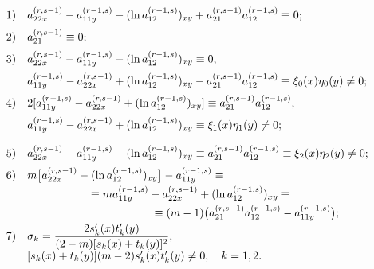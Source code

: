 \begin{equation}
\label{soz:eq34}
\begin{array}{ll}
1) & a_{22x}^{(r,s-1)}-a_{11y}^{(r-1,s)}-(\ln a_{12}^{(r-1,s)})_{xy}+a_{21}^{(r,s-1)}a_{12}^{(r-1,s)}\equiv0; 
\\[2mm]
2) &  a_{21}^{(r,s-1)}\equiv0; 
\\[2mm]
3) & a_{22x}^{(r,s-1)}-a_{11y}^{(r-1,s)}-(\ln a_{12}^{(r-1,s)})_{xy}\equiv0,
\\[2mm]
   & a_{11y}^{(r-1,s)}-a_{22x}^{(r,s-1)}+(\ln a_{12}^{(r-1,s)})_{xy}-a_{21}^{(r,s-1)}a_{12}^{(r-1,s)}\equiv \xi_{0}(x)\eta_{0}(y)\neq0;
\\[2mm]
4) & 2[a_{11y}^{(r-1,s)}-a_{22x}^{(r,s-1)}+(\ln a_{12}^{(r-1,s)})_{xy}]\equiv a_{21}^{(r,s-1)}a_{12}^{(r-1,s)},
\\[2mm]
   & a_{11y}^{(r-1,s)}-a_{22x}^{(r,s-1)}+(\ln a_{12}^{(r-1,s)})_{xy}\equiv\xi_{1}(x)\eta_{1}(y)\neq0;
\\[4mm]
5) & a_{22x}^{(r,s-1)}-a_{11y}^{(r-1,s)}-(\ln a_{12}^{(r-1,s)})_{xy}\equiv a_{21}^{(r,s-1)}a_{12}^{(r-1,s)}\equiv\xi_{2}(x)\eta_{2}(y)\neq0;
\\[2mm]
6) & m\bigl[a_{22x}^{(r,s-1)}-(\ln a_{12}^{(r-1,s)})_{xy}\bigr]-a_{11y}^{(r-1,s)}\equiv
\\[1mm]
   & \hspace{2cm} \equiv ma_{11y}^{(r-1,s)}-a_{22x}^{(r,s-1)}+(\ln a_{12}^{(r-1,s)})_{xy}\equiv
\\[1mm]
   & \hspace{4cm} \equiv(m-1) \bigl(a_{21}^{(r,s-1)}a_{12}^{(r-1,s)}-a_{11y}^{(r-1,s)}\bigr);
\\[1mm]
7) & \sigma_{k}=\dfrac{2s' _{k}(x)t' _{k}(y)}{(2-m)[s_{k}(x)+t_{k}(y)]^{2}},
\\[2mm]
   & [s_{k}(x)+t_{k}(y)](m-2)s' _{k}(x)t' _{k}(y)\neq0,\quad  k=1, 2.
\end{array} \hspace{-1cm}
\end{equation}
